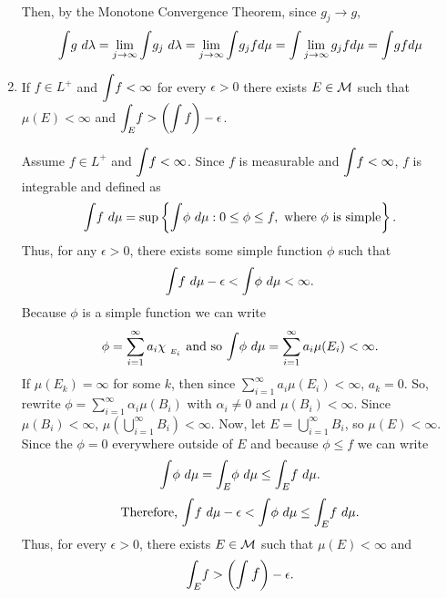 \begin{enumerate}
\begin{pf}
\[\begin{array}{lll}
	\end{array}
	\]
	Then, by the Monotone Convergence Theorem, since $g_j \rightarrow g$, 
	\[
\mathlarger{\int}g\ d\lambda =	\lim_{j\rightarrow \infty}\mathlarger{\int}g_j \ d\lambda =	\lim_{j\rightarrow \infty}\mathlarger{\int}g_j f d\mu =	\mathlarger{\int}\lim_{j\rightarrow \infty} g_j f d\mu=\mathlarger{\int} g f d\mu
	\]
\end{pf}
	\item If $f \in L^+$ and $\mathlarger{\int} f < \infty$ for every $\epsilon>0$ there exists $E \in {\mathcal M}$ such that $\mu(E)< \infty$ and $\mathlarger{\int}_E f > \left(\mathlarger{\int f} \right) - \epsilon$. 
\begin{pf}
	Assume $f \in L^+$ and $\mathlarger{\int} f < \infty$. Since $f$ is measurable and $\mathlarger{\int} f < \infty$, $f$ is integrable and defined as
	\[
\mathlarger{\int} f\ d \mu = \sup \left\{ \mathlarger{\int} \phi \ d \mu : 0 \leq \phi \leq f, \text{ where } \phi \text{ is simple}\right\}.
	\]
	Thus, for any $\epsilon>0$, there exists some simple function $\phi$ such that 
	\[
	\mathlarger{\int} f\ d \mu - \epsilon < \mathlarger{\int} \phi \ d \mu < \infty.
	\]
Because $\phi$ is a simple function we can write
\[
\phi = \sum_{i=1}^\infty a_i \chi_{\ _{E_i}} \text{ and so } \mathlarger{\int} \phi \ d \mu = \sum_{i=1}^\infty a_i \mu(E_i)< \infty.
\]
If $\mu(E_k)= \infty$ for some $k$, then since $\sum_{i=1}^\infty a_i \mu(E_i)< \infty$, $a_k=0$. So, rewrite $\phi=\sum_{i=1}^\infty \alpha_i \mu(B_i)$ with $\alpha_i \neq 0$ and $\mu(B_i)< \infty$. Since $\mu(B_i) < \infty$, $\mu(\bigcup_{i=1}^\infty B_i)< \infty$. 
Now, let $E = \bigcup_{i=1}^\infty B_i$, so $\mu(E)< \infty$. Since the $\phi=0$ everywhere outside of $E$ and because $\phi \leq f$ we can write 
\[
\mathlarger{\int} \phi \ d \mu= \mathlarger{\int}_E \phi \ d \mu \leq \mathlarger{\int}_E  f \ d \mu.
\]
\[
\text{Therefore, } \mathlarger{\int} f\ d \mu - \epsilon < \mathlarger{\int} \phi \ d \mu \leq \mathlarger{\int}_E  f \ d \mu.
\]
Thus, for every $\epsilon>0$, there exists $E \in {\mathcal M}$ such that $\mu(E)< \infty$ and 
\[
\mathlarger{\int}_E f > \left(\mathlarger{\int f} \right) - \epsilon. 
\]
\end{pf}
\end{enumerate}
